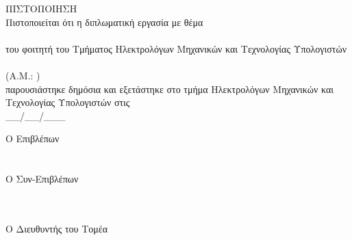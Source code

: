 \pagestyle{empty}
\begin{center}
{\LARGE ΠΙΣΤΟΠΟΙΗΣΗ\\[1cm]}
\large Πιστοποιείται ότι η διπλωματική εργασία με θέμα\\[1cm]
\textbf{\large \doctitlegr }\\[1cm]
του φοιτητή του Τμήματος Ηλεκτρολόγων Μηχανικών και Τεχνολογίας Υπολογιστών\\[1.5cm]
\megr \\[0.5cm]
(Α.Μ.: \studnum )\\[1.5cm]
παρουσιάστηκε δημόσια και εξετάστηκε στο τμήμα  Ηλεκτρολόγων Μηχανικών και Τεχνολογίας Υπολογιστών στις\\[1cm]
\Large{\_\_/\_\_/\_\_\_}\\[1.5cm]
\end{center}
\begin{minipage}{0.5\textwidth}
\begin{flushleft} \large
Ο Επιβλέπων\\[2cm]
\supnamegr \\
\emph{\suptitlegr}\\[1cm]
Ο Συν-Επιβλέπων\\[2cm]
\cosupnamegr \\
\emph{\cosuptitlegr}\\[1cm]
\end{flushleft}
\end{minipage}
\begin{minipage}{0.5\textwidth}
\begin{flushright} \large
Ο Διευθυντής του Τομέα\\[4cm]
\headofdivisiongr\\
\emph{\headofdivisiontitlegr}
\end{flushright}
\end{minipage}
